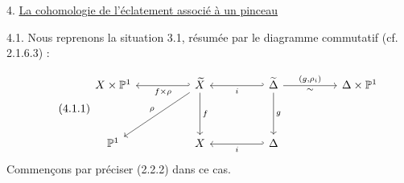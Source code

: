 4. \underline{La cohomologie de l'éclatement associé à un pinceau}

4.1. Nous reprenons la situation 3.1, résumée par le diagramme commutatif (cf. 2.1.6.3) :

\begin{equation}\tag{4.1.1}
\begin{tikzcd}[row sep=huge, column sep=huge]
X \times \mathbb{P}^{1} & \widetilde{X} \arrow[l, hook', "f \times \rho"] \arrow[d, "f"] \arrow[dl, "\rho"'] & \widetilde{\Delta} \arrow[l, hook', "i"] \arrow[d, "g"] \arrow[r, "{(g,\rho_{i})}", "\sim"'] & \Delta \times \mathbb{P}^{1} \\
\mathbb{P}^{1} & X & \Delta \arrow[l, hook', "i"]
\end{tikzcd}
\end{equation}
Commençons par préciser (2.2.2) dans ce cas.

